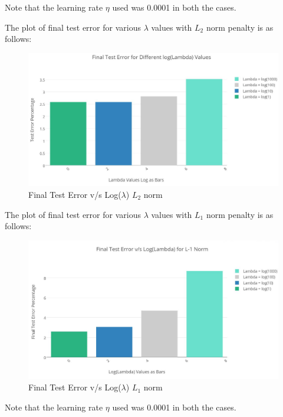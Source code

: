 \documentclass{article}
\begin{document}
Note that the learning rate $\eta$ used was 0.0001 in both the cases.

The plot of final test error for various $\lambda$ values with $L_{2}$ norm penalty is as follows:

\begin{figure}[h!]
  \includegraphics[width=\linewidth]{graphs/5_d_negative.JPG}
  \caption{Final Test Error v/s Log($\lambda$) $L_{2}$ norm}
  \label{fig:graph 5(d) l2}
\end{figure}

The plot of final test error for various $\lambda$ values with $L_{1}$ norm penalty is as follows:

\begin{figure}[h!]
  \includegraphics[width=\linewidth]{graphs/5_d_l1.JPG}
  \caption{Final Test Error v/s Log($\lambda$) $L_{1}$ norm}
  \label{fig:graph 5(d) l1}
\end{figure}

Note that the learning rate $\eta$ used was 0.0001 in both the cases.
\end{document}
